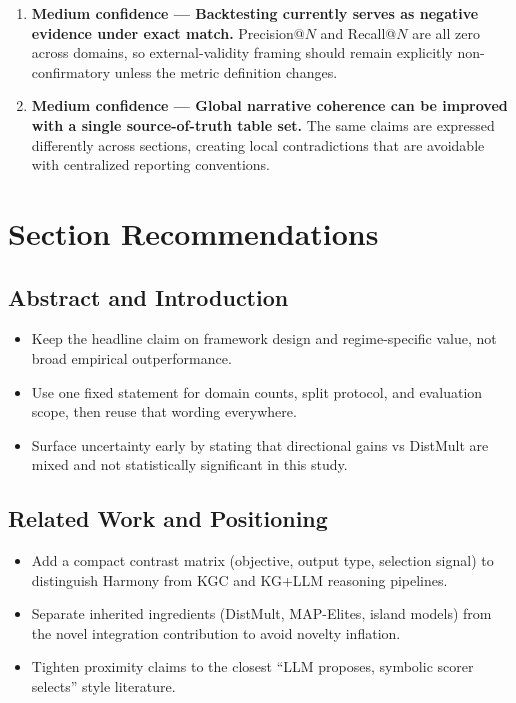 \documentclass[11pt]{article}
\begin{document}
\begin{enumerate}[leftmargin=*]
  \item \textbf{Medium confidence --- Backtesting currently serves as negative evidence under exact match.}
  Precision@\(N\) and Recall@\(N\) are all zero across domains, so external-validity framing should remain explicitly non-confirmatory unless the metric definition changes.

  \item \textbf{Medium confidence --- Global narrative coherence can be improved with a single source-of-truth table set.}
  The same claims are expressed differently across sections, creating local contradictions that are avoidable with centralized reporting conventions.
\end{enumerate}

\section*{Section Recommendations}

\subsection*{Abstract and Introduction}
\begin{itemize}
  \item Keep the headline claim on framework design and regime-specific value, not broad empirical outperformance.
  \item Use one fixed statement for domain counts, split protocol, and evaluation scope, then reuse that wording everywhere.
  \item Surface uncertainty early by stating that directional gains vs DistMult are mixed and not statistically significant in this study.
\end{itemize}

\subsection*{Related Work and Positioning}
\begin{itemize}
  \item Add a compact contrast matrix (objective, output type, selection signal) to distinguish Harmony from KGC and KG+LLM reasoning pipelines.
  \item Separate inherited ingredients (DistMult, MAP-Elites, island models) from the novel integration contribution to avoid novelty inflation.
  \item Tighten proximity claims to the closest ``LLM proposes, symbolic scorer selects'' style literature.
\end{itemize}
\end{document}
